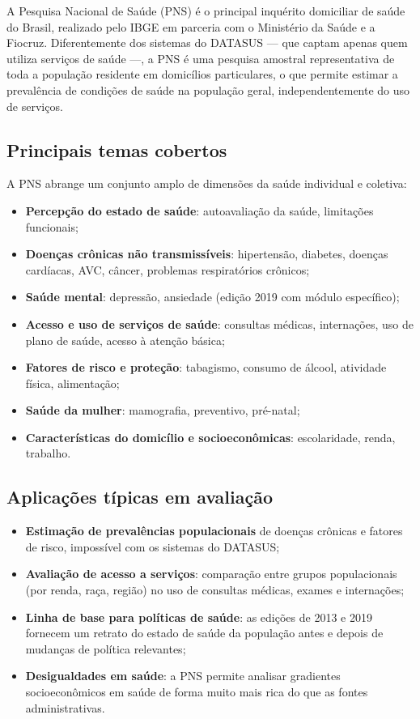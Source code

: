 A Pesquisa Nacional de Saúde (PNS) é o principal inquérito domiciliar de saúde do Brasil, realizado pelo IBGE em parceria com o Ministério da Saúde e a Fiocruz. Diferentemente dos sistemas do DATASUS --- que captam apenas quem utiliza serviços de saúde ---, a PNS é uma pesquisa amostral representativa de toda a população residente em domicílios particulares, o que permite estimar a prevalência de condições de saúde na população geral, independentemente do uso de serviços.

\subsection{Principais temas cobertos}

A PNS abrange um conjunto amplo de dimensões da saúde individual e coletiva:

\begin{itemize}
  \item \textbf{Percepção do estado de saúde}: autoavaliação da saúde, limitações funcionais;
  \item \textbf{Doenças crônicas não transmissíveis}: hipertensão, diabetes, doenças cardíacas, AVC, câncer, problemas respiratórios crônicos;
  \item \textbf{Saúde mental}: depressão, ansiedade (edição 2019 com módulo específico);
  \item \textbf{Acesso e uso de serviços de saúde}: consultas médicas, internações, uso de plano de saúde, acesso à atenção básica;
  \item \textbf{Fatores de risco e proteção}: tabagismo, consumo de álcool, atividade física, alimentação;
  \item \textbf{Saúde da mulher}: mamografia, preventivo, pré-natal;
  \item \textbf{Características do domicílio e socioeconômicas}: escolaridade, renda, trabalho.
\end{itemize}

\subsection{Aplicações típicas em avaliação}

\begin{itemize}
  \item \textbf{Estimação de prevalências populacionais} de doenças crônicas e fatores de risco, impossível com os sistemas do DATASUS;
  \item \textbf{Avaliação de acesso a serviços}: comparação entre grupos populacionais (por renda, raça, região) no uso de consultas médicas, exames e internações;
  \item \textbf{Linha de base para políticas de saúde}: as edições de 2013 e 2019 fornecem um retrato do estado de saúde da população antes e depois de mudanças de política relevantes;
  \item \textbf{Desigualdades em saúde}: a PNS permite analisar gradientes socioeconômicos em saúde de forma muito mais rica do que as fontes administrativas.
\end{itemize}

